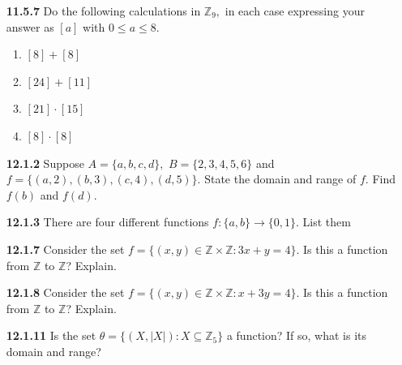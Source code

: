 \documentclass[11pt]{report}
\theoremstyle{plain}
\newcommand{\Z}{\mathbb{Z}}
\begin{document}
\begin{enumerate}
\item[\textbf{11.5.7}] Do the following calculations in $\Z_9,$ in each case expressing your answer as $[a]$ with $0 \leq a \leq 8.$
	\begin{enumerate}
	\item $[8]+[8]$ 
	\item $[24]+[11]$ 
	\item $[21]\cdot[15]$ 
	\item $[8]\cdot[8]$
	\end{enumerate}
\item[\textbf{12.1.2}]  Suppose $A =\{a,b,c,d\},$  $B =\{2,3,4,5,6\}$ and $f =\{(a,2),(b,3),(c,4),(d,5)\}.$ State the domain and range of $f.$ Find $f (b)$ and $f (d).$
\item[\textbf{12.1.3}] There are four different functions $f : \{a,b\} \to \{0,1\}.$ List them
\item[\textbf{12.1.7}] Consider the set $f =\{(x, y) \in \Z \times \Z : 3x + y = 4\}.$ Is this a function from $\Z$ to  $\Z$?
Explain.
\item[\textbf{12.1.8}] Consider the set $f =\{(x, y) \in \Z \times \Z : x + 3y = 4\}.$ Is this a function from $\Z$ to $\Z$?
Explain.
\item[\textbf{12.1.11}] Is the set $\theta =\{(X,|X|) : X \subseteq \Z_5\}$ a function? If so, what is its domain and range?


\end{enumerate}
\end{document}
